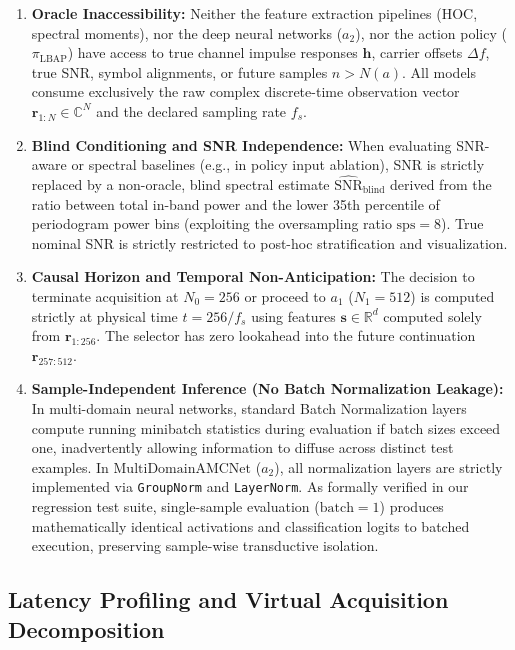 \begin{enumerate}
    \item \textbf{Oracle Inaccessibility:} Neither the feature extraction pipelines (HOC, spectral moments), nor the deep neural networks ($a_2$), nor the action policy ($\pi_{\text{LBAP}}$) have access to true channel impulse responses $\mathbf{h}$, carrier offsets $\Delta f$, true SNR, symbol alignments, or future samples $n > N(a)$. All models consume exclusively the raw complex discrete-time observation vector $\mathbf{r}_{1:N} \in \mathbb{C}^N$ and the declared sampling rate $f_s$.
    \item \textbf{Blind Conditioning and SNR Independence:} When evaluating SNR-aware or spectral baselines (e.g., in policy input ablation), SNR is strictly replaced by a non-oracle, blind spectral estimate $\widehat{\text{SNR}}_{\text{blind}}$ derived from the ratio between total in-band power and the lower 35th percentile of periodogram power bins (exploiting the oversampling ratio $\text{sps} = 8$). True nominal SNR is strictly restricted to post-hoc stratification and visualization.
    \item \textbf{Causal Horizon and Temporal Non-Anticipation:} The decision to terminate acquisition at $N_0 = 256$ or proceed to $a_1$ ($N_1 = 512$) is computed strictly at physical time $t = 256 / f_s$ using features $\mathbf{s} \in \mathbb{R}^d$ computed solely from $\mathbf{r}_{1:256}$. The selector has zero lookahead into the future continuation $\mathbf{r}_{257:512}$.
    \item \textbf{Sample-Independent Inference (No Batch Normalization Leakage):} In multi-domain neural networks, standard Batch Normalization layers compute running minibatch statistics during evaluation if batch sizes exceed one, inadvertently allowing information to diffuse across distinct test examples. In $\text{MultiDomainAMCNet}$ ($a_2$), all normalization layers are strictly implemented via \texttt{GroupNorm} and \texttt{LayerNorm}. As formally verified in our regression test suite, single-sample evaluation ($\text{batch}=1$) produces mathematically identical activations and classification logits to batched execution, preserving sample-wise transductive isolation.
\end{enumerate}

\subsection{Latency Profiling and Virtual Acquisition Decomposition}
\label{subsec:latency_protocol}

